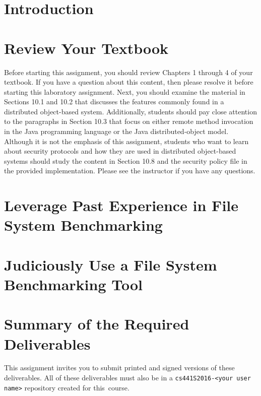 

\usepackage[compact]{titlesec}



\section*{Introduction}



\section*{Review Your Textbook}

Before starting this assignment, you should review Chapters 1 through 4 of your textbook. If you have a question about
this content, then please resolve it before starting this laboratory assignment. Next, you should examine the material
in Sections 10.1 and 10.2 that discusses the features commonly found in a distributed object-based system. Additionally,
students should pay close attention to the paragraphs in Section 10.3 that focus on either remote method invocation in the Java
programming language or the Java distributed-object model. Although it is not the emphasis of this assignment, students
who want to learn about security protocols and how they are used in distributed object-based systems should study the
content in Section 10.8 and the security policy file in the provided implementation.  Please see the instructor if you
have any questions.

\section*{Leverage Past Experience in File System Benchmarking}



\section*{Judiciously Use a File System Benchmarking Tool}


\section*{Summary of the Required Deliverables}

This assignment invites you to submit printed and signed versions of these deliverables. All of these deliverables must
also be in a {\tt cs441S2016-<your user name>} repository created for \mbox{this course}.

